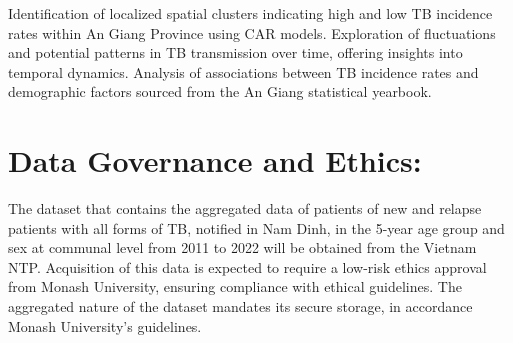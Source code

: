 \documentclass[
  number,
  preprint,
  3p]{elsarticle}
\begin{document}
Identification of localized spatial clusters indicating high and low TB
incidence rates within An Giang Province using CAR models. Exploration
of fluctuations and potential patterns in TB transmission over time,
offering insights into temporal dynamics. Analysis of associations
between TB incidence rates and demographic factors sourced from the An
Giang statistical yearbook.

\hypertarget{data-governance-and-ethics}{%
\section{Data Governance and Ethics:}\label{data-governance-and-ethics}}

The dataset that contains the aggregated data of patients of new and
relapse patients with all forms of TB, notified in Nam Dinh, in the
5-year age group and sex at communal level from 2011 to 2022 will be
obtained from the Vietnam NTP. Acquisition of this data is expected to
require a low-risk ethics approval from Monash University, ensuring
compliance with ethical guidelines. The aggregated nature of the dataset
mandates its secure storage, in accordance Monash University's
guidelines.


\renewcommand\refname{References}
  
\end{document}

